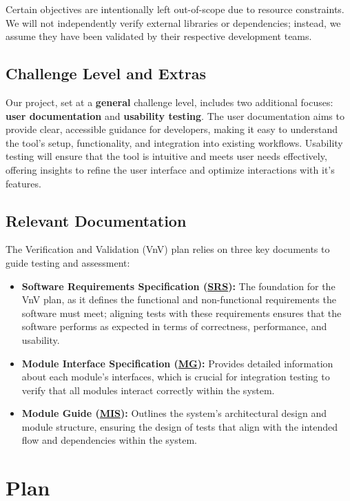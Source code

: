 \documentclass[12pt, titlepage]{article}
\newcommand{\SRS}{\href{https://github.com/ssm-lab/capstone--source-code-optimizer/blob/main/docs/SRS/SRS.pdf}{SRS}}
\newcommand{\MG}{\href{https://github.com/ssm-lab/capstone--source-code-optimizer/blob/main/docs/Design/SoftArchitecture/MG.pdf}{MG}}
\newcommand{\MIS}{\href{https://github.com/ssm-lab/capstone--source-code-optimizer/blob/main/docs/Design/SoftDetailedDes/MIS.pdf}{MIS}}
\begin{document}
Certain objectives are intentionally left out-of-scope due to resource constraints. We will not independently verify external libraries or dependencies; instead, we assume they have been validated by their respective development teams. 

\subsection{Challenge Level and Extras}

Our project, set at a \textbf{general} challenge level, includes two additional focuses: \textbf{user documentation} and \textbf{usability testing}. The user documentation aims to provide clear, accessible guidance for developers, making it easy to understand the tool’s setup, functionality, and integration into existing workflows. Usability testing will ensure that the tool is intuitive and meets user needs effectively, offering insights to refine the user interface and optimize interactions with it's features.

\subsection{Relevant Documentation}

The Verification and Validation (VnV) plan relies on three key documents to guide testing and assessment: 
\begin{itemize}
  \item[] \textbf{Software Requirements Specification (\SRS)\cite{SRS}:} The foundation for the VnV plan, as it defines the functional and non-functional requirements the software must meet; aligning tests with these requirements ensures that the software performs as expected in terms of correctness, performance, and usability.
  
  \item[] \textbf{Module Interface Specification (\MG)\cite{MGDoc}:} Provides detailed information about each module's interfaces, which is crucial for integration testing to verify that all modules interact correctly within the system.
  
  \item[] \textbf{Module Guide (\MIS)\cite{MISDoc}:} Outlines the system's architectural design and module structure, ensuring the design of tests that align with the intended flow and dependencies within the system.
\end{itemize}

\section{Plan}
\end{document}
